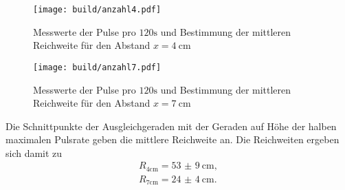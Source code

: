 \begin{figure}[H]
  \centering
  \caption{Messwerte der Pulse pro $120\unit{\second}$ und Bestimmung der mittleren Reichweite für den Abstand $x = \qty{4}{\centi\meter}$}
  \label{fig:13}
  \texttt{[image: build/anzahl4.pdf]}
\end{figure}

\begin{figure}[H]
  \centering
  \caption{Messwerte der Pulse pro $120\unit{\second}$ und Bestimmung der mittleren Reichweite für den Abstand $x = \qty{7}{\centi\meter}$}
  \label{fig:14}
  \texttt{[image: build/anzahl7.pdf]}
\end{figure}
\noindent Die Schnittpunkte der Ausgleichgeraden mit der Geraden auf Höhe der
halben maximalen Pulsrate geben die mittlere Reichweite an. Die Reichweiten
ergeben sich damit zu 
\begin{align}
  R_\text{4cm} = \qty{53(9)}{\centi\meter}, \\
  R_\text{7cm} = \qty{24(4)}{\centi\meter}.
\end{align}

